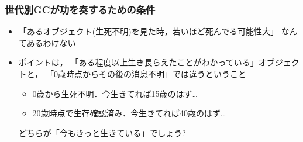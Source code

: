 \documentclass[11pt,dvipdfmx]{beamer}
\newif\ifja
\newif\ifeng
\newcommand{\ao}[1]{{\color{blue}#1}}
\begin{document}
\begin{frame}
\frametitle{世代別GCが功を奏するための条件}

\begin{itemize}
\item 「あるオブジェクト(生死不明)を見た時，\ao{若いほど死んでる可能性大}」
  なんてあるわけない
\item ポイントは，
「ある程度以上生き長らえたことがわかっている」オブジェクトと，
「0歳時点からその後の消息不明」では違うということ
\begin{itemize}
\item \ao{0歳から生死不明．今生きてれば15歳}のはず\ldots
\item \ao{20歳時点で生存確認済み．今生きてれば40歳}のはず\ldots
\end{itemize}
どちらが「今もきっと生きている」でしょう?

\end{itemize}
\end{frame}
\fi

\ifja
\begin{frame}
\frametitle{(Weak) Generational Hypothesis}
\begin{itemize}
\item 「ほとんどのオブジェクトは短命」
  (``most objects die young'')

\item (メモリ割り当て手段がヒープしかない言語では)
  多くのプログラムで成り立っていそうな性質

\begin{center}
\texttt{[image: out/pdf/svg/lifetime\_distribution.pdf]}
\end{center}
\end{itemize}
\end{frame}
\fi
\ifeng
\begin{frame}
\frametitle{(Weak) generational hypothesis}
\begin{itemize}
\item \ao{\it ``most objects die young''}

\item it seems to hold in most languages
  (where all memory allocations are served from the heap)

\begin{center}
\texttt{[image: out/pdf/svg/lifetime\_distribution.pdf]}
\end{center}
\end{itemize}
\end{frame}
\fi
\end{document}

